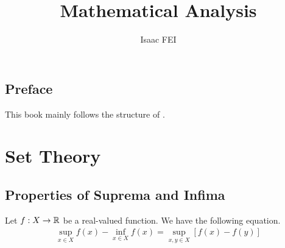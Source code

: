 \documentclass[thmcnt=section, 12pt]{my-elegantbook}
\title{Mathematical Analysis}
\author{Isaac FEI}
\begin{document}
\maketitle


\frontmatter
\section*{Preface}

This book mainly follows the structure of \parencite{apostolMathematicalAnalysisModern1974}.


\tableofcontents
\mainmatter



\chapter{Set Theory}


\section{Properties of Suprema and Infima}

\begin{theorem} \label{thm:27}
    Let $f: X \to \mathbb{R}$ be a real-valued function. We have the following equation.
    \begin{align}
        \sup_{x \in X} f(x) - \inf_{x \in X} f(x)
        = \sup_{x,y \in X} [f(x) - f(y)]
        \label{eq:66}
    \end{align}
\end{theorem}
\end{document}
